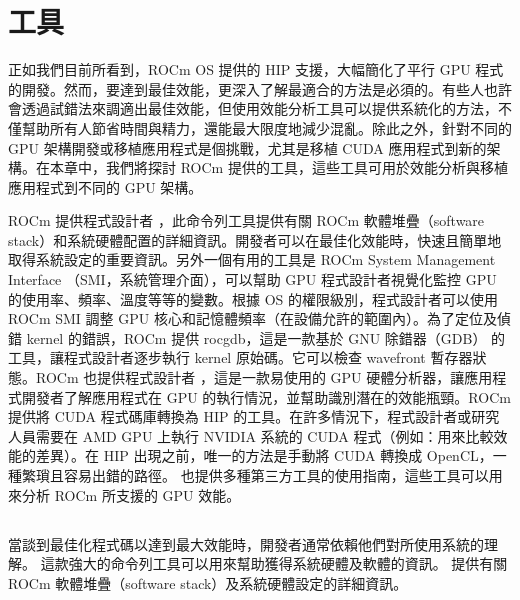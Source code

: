 \titleformat{\subsection}{\large\bfseries\CJKsection}{\thesubsection}{1em}{}

\chapter{ 工具}
\label{chap:HIP Tools}

正如我們目前所看到，ROCm OS 提供的 HIP 支援，大幅簡化了平行 GPU 程式的開發。然而，要達到最佳效能，更深入了解最適合的方法是必須的。有些人也許會透過試錯法來調適出最佳效能，但使用效能分析工具可以提供系統化的方法，不僅幫助所有人節省時間與精力，還能最大限度地減少混亂。除此之外，針對不同的 GPU 架構開發或移植應用程式是個挑戰，尤其是移植 CUDA 應用程式到新的架構。在本章中，我們將探討 ROCm 提供的工具，這些工具可用於效能分析與移植應用程式到不同的 GPU 架構。

ROCm 提供程式設計者 ，此命令列工具提供有關 ROCm 軟體堆疊（software stack）和系統硬體配置的詳細資訊。開發者可以在最佳化效能時，快速且簡單地取得系統設定的重要資訊。另外一個有用的工具是 ROCm System Management Interface （SMI，系統管理介面），可以幫助 GPU 程式設計者視覺化監控 GPU 的使用率、頻率、溫度等等的變數。根據 OS 的權限級別，程式設計者可以使用 ROCm SMI 調整 GPU 核心和記憶體頻率（在設備允許的範圍內）。為了定位及偵錯 kernel 的錯誤，ROCm 提供 rocgdb，這是一款基於 GNU 除錯器（GDB） 的工具，讓程式設計者逐步執行 kernel 原始碼。它可以檢查 wavefront 暫存器狀態。ROCm 也提供程式設計者 ，這是一款易使用的 GPU 硬體分析器，讓應用程式開發者了解應用程式在 GPU 的執行情況，並幫助識別潛在的效能瓶頸。ROCm 提供將 CUDA 程式碼庫轉換為 HIP 的工具。在許多情況下，程式設計者或研究人員需要在 AMD GPU 上執行 NVIDIA 系統的 CUDA 程式（例如：用來比較效能的差異）。在 HIP 出現之前，唯一的方法是手動將 CUDA 轉換成 OpenCL，一種繁瑣且容易出錯的路徑。 也提供多種第三方工具的使用指南，這些工具可以用來分析 ROCm 所支援的 GPU 效能。

\section{}

當談到最佳化程式碼以達到最大效能時，開發者通常依賴他們對所使用系統的理解。 這款強大的命令列工具可以用來幫助獲得系統硬體及軟體的資訊。 提供有關 ROCm 軟體堆疊（software stack）及系統硬體設定的詳細資訊。

